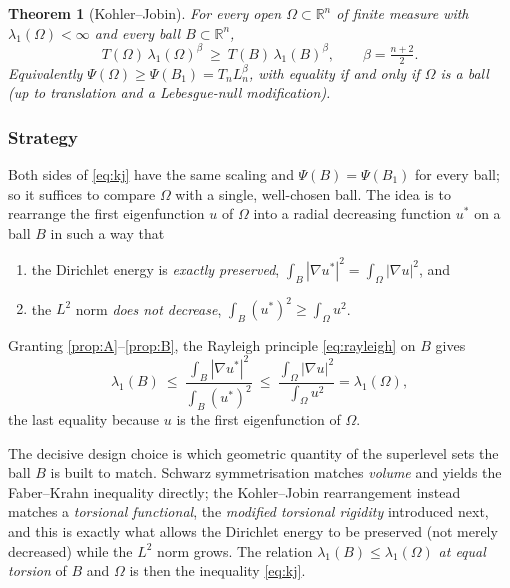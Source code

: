 \documentclass[11pt]{amsart}
\newtheorem{theorem}{Theorem}[section]
\theoremstyle{definition}
\newcommand{\R}{\mathbb R}
\newcommand{\Om}{\Omega}
\newcommand{\abs}[1]{\left|#1\right|}
\begin{document}
\begin{theorem}[Kohler--Jobin]\label{thm:kj}
For every open $\Om\subset\R^n$ of finite measure with $\lambda_1(\Om)<\infty$
and every ball $B\subset\R^n$,
\begin{equation}\label{eq:kj}
  T(\Om)\,\lambda_1(\Om)^{\beta}\ \ge\ T(B)\,\lambda_1(B)^{\beta},
  \qquad\beta=\tfrac{n+2}{2}.
\end{equation}
Equivalently $\Psi(\Om)\ge\Psi(B_1)=T_n L_n^{\beta}$, with equality if and
only if $\Om$ is a ball (up to translation and a Lebesgue-null modification).
\end{theorem}

\subsubsection*{Strategy}

Both sides of \eqref{eq:kj} have the same scaling and $\Psi(B)=\Psi(B_1)$
for every ball; so it suffices to compare $\Om$ with a single, well-chosen
ball. The idea is to rearrange the first eigenfunction $u$ of $\Om$ into a
radial decreasing function $u^*$ on a ball $B$ in such a way that
\begin{enumerate}[label=\textup{(\Alph*)}]
\item\label{prop:A} the Dirichlet energy is \emph{exactly preserved},
$\int_B\abs{\nabla u^*}^2=\int_\Om\abs{\nabla u}^2$, and
\item\label{prop:B} the $L^2$ norm \emph{does not decrease},
$\int_B(u^*)^2\ge\int_\Om u^2$.
\end{enumerate}
Granting \ref{prop:A}--\ref{prop:B}, the Rayleigh principle
\eqref{eq:rayleigh} on $B$ gives
\begin{equation}\label{eq:rayleigh-chain}
  \lambda_1(B)\ \le\
  \frac{\int_B\abs{\nabla u^*}^2}{\int_B(u^*)^2}
  \ \le\
  \frac{\int_\Om\abs{\nabla u}^2}{\int_\Om u^2}
  =\lambda_1(\Om),
\end{equation}
the last equality because $u$ is the first eigenfunction of $\Om$.

The decisive design choice is which geometric quantity of the superlevel
sets the ball $B$ is built to match. Schwarz symmetrisation matches
\emph{volume} and yields the Faber--Krahn inequality directly; the
Kohler--Jobin rearrangement instead matches a \emph{torsional functional},
the \emph{modified torsional rigidity} introduced next, and this is exactly
what allows the Dirichlet energy to be preserved (not merely decreased)
while the $L^2$ norm grows. The relation $\lambda_1(B)\le\lambda_1(\Om)$
\emph{at equal torsion} of $B$ and $\Om$ is then the inequality
\eqref{eq:kj}.
\end{document}
